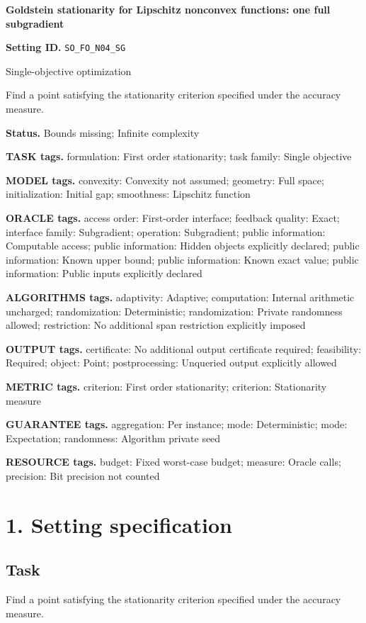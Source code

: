 \documentclass[10pt,a4paper]{article}
\begin{document}
\raggedright

{\LARGE\bfseries\sffamily\color{AtlasNavy} Goldstein stationarity for Lipschitz nonconvex functions: one full subgradient\par}\vspace{5pt}
\textbf{Setting ID.} \texttt{SO\_\allowbreak{}FO\_\allowbreak{}N04\_\allowbreak{}SG}

Single-objective optimization

Find a point satisfying the stationarity criterion specified under the accuracy measure.

\textbf{Status.} Bounds missing; Infinite complexity

\textbf{TASK tags.} formulation: First order stationarity; task family: Single objective

\textbf{MODEL tags.} convexity: Convexity not assumed; geometry: Full space; initialization: Initial gap; smoothness: Lipschitz function

\textbf{ORACLE tags.} access order: First-order interface; feedback quality: Exact; interface family: Subgradient; operation: Subgradient; public information: Computable access; public information: Hidden objects explicitly declared; public information: Known upper bound; public information: Known exact value; public information: Public inputs explicitly declared

\textbf{ALGORITHMS tags.} adaptivity: Adaptive; computation: Internal arithmetic uncharged; randomization: Deterministic; randomization: Private randomness allowed; restriction: No additional span restriction explicitly imposed

\textbf{OUTPUT tags.} certificate: No additional output certificate required; feasibility: Required; object: Point; postprocessing: Unqueried output explicitly allowed

\textbf{METRIC tags.} criterion: First order stationarity; criterion: Stationarity measure

\textbf{GUARANTEE tags.} aggregation: Per instance; mode: Deterministic; mode: Expectation; randomness: Algorithm private seed

\textbf{RESOURCE tags.} budget: Fixed worst-case budget; measure: Oracle calls; precision: Bit precision not counted

\section{1. Setting specification}
\subsection{Task}
Find a point satisfying the stationarity criterion specified under the accuracy measure.
\end{document}
